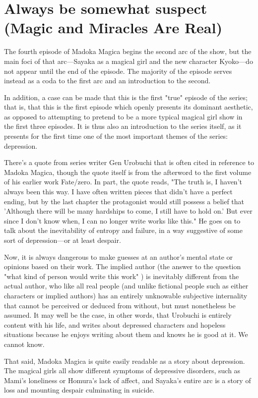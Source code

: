 \chapter{Always be somewhat suspect (Magic and Miracles Are Real)}
The fourth episode of Madoka Magica begins the second arc of the show, but the main foci of that arc—Sayaka as a magical girl and the new character Kyoko—do not appear until the end of the episode. The majority of the episode serves instead as a coda to the first arc and an introduction to the second.

In addition, a case can be made that this is the first "true" episode of the series; that is, that this is the first episode which openly presents its dominant aesthetic, as opposed to attempting to pretend to be a more typical magical girl show in the first three episodes. It is thus also an introduction to the series itself, as it presents for the first time one of the most important themes of the series: depression.

There's a quote from series writer Gen Urobuchi that is often cited in reference to Madoka Magica, though the quote itself is from the afterword to the first volume of his earlier work Fate/zero. In part, the quote reads, "The truth is, I haven't always been this way. I have often written pieces that didn't have a perfect ending, but by the last chapter the protagonist would still possess a belief that 'Although there will be many hardships to come, I still have to hold on.' But ever since I don't know when, I can no longer write works like this." \cite{ref37} He goes on to talk about the inevitability of entropy and failure, in a way suggestive of some sort of depression—or at least despair.

Now, it is always dangerous to make guesses at an author's mental state or opinions based on their work. The implied author (the answer to the question "what kind of person would write this work" \cite{ref38}) is inevitably different from the actual author, who like all real people (and unlike fictional people such as either characters or implied authors) has an entirely unknowable subjective internality that cannot be perceived or deduced from without, but must nonetheless be assumed. It may well be the case, in other words, that Urobuchi is entirely content with his life, and writes about depressed characters and hopeless situations because he enjoys writing about them and knows he is good at it. We cannot know.

That said, Madoka Magica is quite easily readable as a story about depression. The magical girls all show different symptoms of depressive disorders, such as Mami's loneliness or Homura's lack of affect, and Sayaka's entire arc is a story of loss and mounting despair culminating in suicide. 

